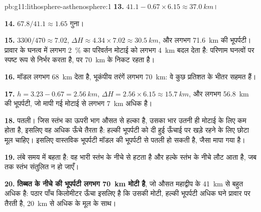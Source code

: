 \begin{solution}{pb:g11:lithosphere-asthenosphere:1}
\textbf{13.} $41.1 - 0.67 \times 6.15 \approx \qty{37.0}{km}$।

\textbf{14.} $67.8/41.1 \approx 1.65$ गुना।

\textbf{15.} $3300/470 \approx 7.02$, $\Delta H \approx 4.34 \times 7.02
\approx \qty{30.5}{km}$, और लगभग \qty{71.6}{km} की भूपर्पटी। प्रावार के घनत्व में
लगभग \qty{2}{\percent} का परिवर्तन मोटाई को
लगभग \qty{4}{km} बदल देता है: परिणाम घनत्वों पर स्पष्ट रूप से निर्भर करता है, पर
\qty{70}{km} के निकट रहता है।

\textbf{16.} मॉडल लगभग \qty{68}{km} देता है, भूकंपीय तरंगें लगभग
\qty{70}{km}: वे कुछ प्रतिशत के भीतर सहमत हैं।

\textbf{17.} $h = 3.23 - 0.67 = \qty{2.56}{km}$, $\Delta H = 2.56 \times
6.15 \approx \qty{15.7}{km}$, और लगभग \qty{56.8}{km} की भूपर्पटी, जो मापी गई मोटाई से
लगभग \qty{7}{km} अधिक है।

\textbf{18.} पतली। जिस स्तंभ का ऊपरी भाग औसत से हल्का है, उसका भार
उतनी ही मोटाई के लिए कम होता है, इसलिए वह अधिक ऊँचे तैरता है: हल्की भूपर्पटी को
दी हुई ऊँचाई पर खड़े रहने के लिए छोटा मूल चाहिए। इसलिए वास्तविक भूपर्पटी
मॉडल की भूपर्पटी से पतली हो सकती है, जैसा मापा गया है।

\textbf{19.} लंबे समय में  बहता है: वह भारी स्तंभ के नीचे से
हटता है और हल्के स्तंभ के नीचे लौट आता है, जब तक स्तंभ संतुलित न हो जाएँ।

\textbf{20.} \textbf{तिब्बत के नीचे की भूपर्पटी लगभग \qty{70}{km} मोटी है}, जो
औसत महाद्वीप के \qty{41}{km} से बहुत अधिक है: पठार पाँच
किलोमीटर ऊँचा इसलिए है कि उसकी मोटी, हल्की भूपर्पटी अधिक घने प्रावार पर तैरती है,
\qty{20}{km} से अधिक के मूल के साथ।
\end{solution}

